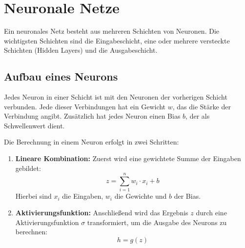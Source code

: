 \section{Neuronale Netze}

Ein neuronales Netz besteht aus mehreren Schichten von Neuronen. Die wichtigsten Schichten sind die Eingabeschicht, eine oder mehrere versteckte Schichten (Hidden Layers) und die Ausgabeschicht.

\subsection*{Aufbau eines Neurons}

Jedes Neuron in einer Schicht ist mit den Neuronen der vorherigen Schicht verbunden. Jede dieser Verbindungen hat ein Gewicht \( w \), das die Stärke der Verbindung angibt. Zusätzlich hat jedes Neuron einen Bias \( b \), der als Schwellenwert dient.

Die Berechnung in einem Neuron erfolgt in zwei Schritten:

\begin{enumerate}
    \item \textbf{Lineare Kombination:} Zuerst wird eine gewichtete Summe der Eingaben gebildet:
    \[
    z = \sum_{i=1}^{n} w_i \cdot x_i + b
    \]
    Hierbei sind \( x_i \) die Eingaben, \( w_i \) die Gewichte und \( b \) der Bias.

    \item \textbf{Aktivierungsfunktion:} Anschließend wird das Ergebnis \( z \) durch eine Aktivierungsfunktion \( \sigma \) transformiert, um die Ausgabe des Neurons zu berechnen:
    \[
    h = g(z)
    \]

\end{enumerate}


